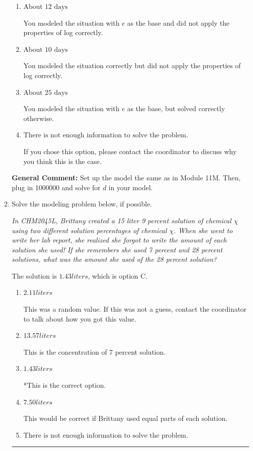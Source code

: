 \documentclass{extbook}[14pt]
\newcommand{\litem}[1]{\item #1

\rule{\textwidth}{0.4pt}}
\begin{document}
\begin{enumerate}
{\begin{enumerate}[label=\Alph*.]
* This is the correct option.
\item \( \text{About } 12 \text{ days} \)

You modeled the situation with $e$ as the base and did not apply the properties of log correctly.
\item \( \text{About } 10 \text{ days} \)

You modeled the situation correctly but did not apply the properties of log correctly.
\item \( \text{About } 25 \text{ days} \)

You modeled the situation with $e$ as the base, but solved correctly otherwise.
\item \( \text{There is not enough information to solve the problem.} \)

If you chose this option, please contact the coordinator to discuss why you think this is the case.
\end{enumerate}

\textbf{General Comment:} Set up the model the same as in Module 11M. Then, plug in 1000000 and solve for $d$ in your model.
}
\litem{
Solve the modeling problem below, if possible.

\begin{center}
    \textit{ In CHM2045L, Brittany created a 15 liter 9 percent solution of chemical $\chi$ using two different solution percentages of chemical $\chi$. When she went to write her lab report, she realized she forgot to write the amount of each solution she used! If she remembers she used 7 percent and 28 percent solutions, what was the amount she used of the 28 percent solution? }
\end{center}
The solution is \( 1.43 liters \), which is option C.\begin{enumerate}[label=\Alph*.]
\item \( 2.11 liters \)

This was a random value. If this was not a guess, contact the coordinator to talk about how you got this value.
\item \( 13.57 liters \)

This is the concentration of 7 percent solution.
\item \( 1.43 liters \)

*This is the correct option.
\item \( 7.50 liters \)

This would be correct if Brittany used equal parts of each solution.
\item \( \text{There is not enough information to solve the problem.} \)


\end{enumerate}}
\end{enumerate}
\end{document}
